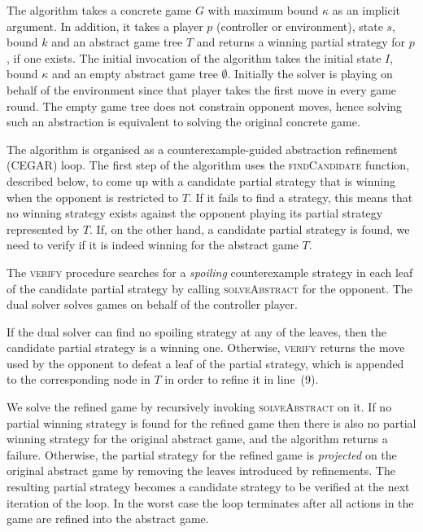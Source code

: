 \documentclass{llncs}
\newtheorem*{exmp}{Example}
\begin{document}
The algorithm takes a concrete game $G$ with maximum bound $\kappa$ as an implicit
argument.  In addition, it takes a player $p$ (controller or environment),
state $s$, bound $k$ and an abstract game tree $T$ and returns a winning
partial strategy for $p$, if one exists.  The initial invocation of the
algorithm takes the initial state $I$, bound $\kappa$ and an empty abstract
game tree $\emptyset$.  Initially the solver is playing on behalf of the
environment since that player takes the first move in every game round.  The
empty game tree does not constrain opponent moves, hence solving such an
abstraction is equivalent to solving the original concrete game.

The algorithm is organised as a counterexample-guided abstraction refinement
(CEGAR) loop.  The first step of the algorithm uses the \textsc{findCandidate}
function, described below, to come up with a candidate partial strategy that is
winning when the opponent is restricted to $T$.  If it fails to find a
strategy, this means that no winning strategy exists against the opponent
playing its partial strategy represented by $T$.  If, on the other hand, a
candidate partial strategy is found, we need to verify if it is indeed winning
for the abstract game $T$.

The \textsc{verify} procedure searches for a \emph{spoiling} counterexample
strategy in each leaf of the candidate partial strategy by calling
\textsc{solveAbstract} for the opponent. The dual solver solves games on behalf
of the controller player.  

If the dual solver can find no spoiling strategy at any of the leaves, then the
candidate partial strategy is a winning one. Otherwise, \textsc{verify} returns
the move used by the opponent to defeat a leaf of the partial strategy, which
is appended to the corresponding node in $T$ in order to refine it in line~(9).


We solve the refined game by recursively invoking \textsc{solveAbstract} on it.
If no partial winning strategy is found for the refined game then there is also
no partial winning strategy for the original abstract game, and the algorithm
returns a failure.  Otherwise, the partial strategy for the refined game is
\emph{projected} on the original abstract game by removing the leaves
introduced by refinements. The resulting partial strategy becomes a candidate
strategy to be verified at the next iteration of the loop. In the worst case
the loop terminates after all actions in the game are refined into the abstract
game.
\end{document}

